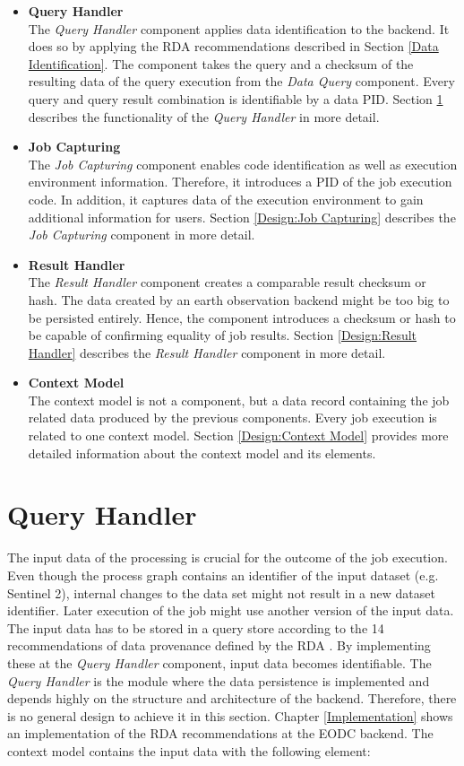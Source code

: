 \documentclass[draft,final]{vutinfth} %
\begin{document}
 \begin{itemize}
	\item \textbf{Query Handler} \\
	The \textit{Query Handler} component applies data identification to the backend. It does so by applying the RDA recommendations described in Section \ref{Data Identification}. The component takes the query and {a checksum of the} resulting data of the query execution from the \textit{Data Query} component. Every query and query result combination is identifiable by a data PID. Section \ref{Design:Data Identification} describes the functionality of the \textit{Query Handler} in more detail.     
	\item \textbf{Job Capturing} \\ 
	The \textit{Job Capturing} component enables code identification as well as execution environment information. Therefore, it introduces a PID of the job execution code. In addition, it captures data of the execution environment to gain additional information for users. Section \ref{Design:Job Capturing} describes the \textit{Job Capturing} component in more detail.
	\item \textbf{Result Handler} \\
	The \textit{Result Handler} component creates a comparable result checksum or hash. The data created by an earth observation backend might be too big to be persisted entirely. Hence, the component introduces a checksum or hash to be capable of confirming equality of job results. Section \ref{Design:Result Handler} describes the \textit{Result Handler} component in more detail.   
	\item \textbf{Context Model} \\ 
	The context model is not a component, but a data record containing the job related data produced by the previous components. Every job execution is related to one context model. Section \ref{Design:Context Model} provides more detailed information about the context model and its elements. 
\end{itemize}

\section{Query Handler}\label{Design:Data Identification}
The input data of the processing is crucial for the outcome of the job execution. Even though the process graph contains an identifier of the input dataset (e.g. Sentinel 2), internal changes to the data set might not result in a new dataset identifier. Later execution of the job might use another version of the input data. The input data has to be stored in a query store according to the 14 recommendations of data provenance defined by the RDA \cite{rauber2016identification}. By implementing these at the \textit{Query Handler} component, input data becomes identifiable. The \textit{Query Handler} is the module where the data persistence is implemented and depends highly on the structure and architecture of the backend. Therefore, there is no general design to achieve it in this section. Chapter \ref{Implementation} shows an implementation of the RDA recommendations at the EODC backend. The context model contains the input data with the following element: 
\end{document}
